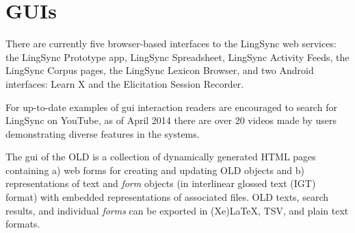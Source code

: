 \documentclass[11pt]{article}
\begin{document}
\section{GUIs}

There are currently five browser-based interfaces to the LingSync web services:
the LingSync Prototype app, LingSync Spreadsheet, LingSync Activity Feeds, the
LingSync Corpus pages,  the LingSync Lexicon Browser, and two Android interfaces: Learn X and the Elicitation Session Recorder.

For up-to-date examples of \gls{gui} interaction readers are encouraged to search for LingSync on YouTube, as of April 2014 there are over 20 videos made by users demonstrating diverse features in the systems.

%
%



The \gls{gui} of the OLD %
is a collection of dynamically generated HTML pages containing a) web forms for
creating and updating OLD objects and b) representations of text and
\emph{form} objects (in interlinear glossed text (IGT) format) with embedded
representations of associated files. OLD texts, search results, and individual
\emph{forms} can be exported in (Xe)LaTeX, TSV, and plain text formats.
\end{document}
